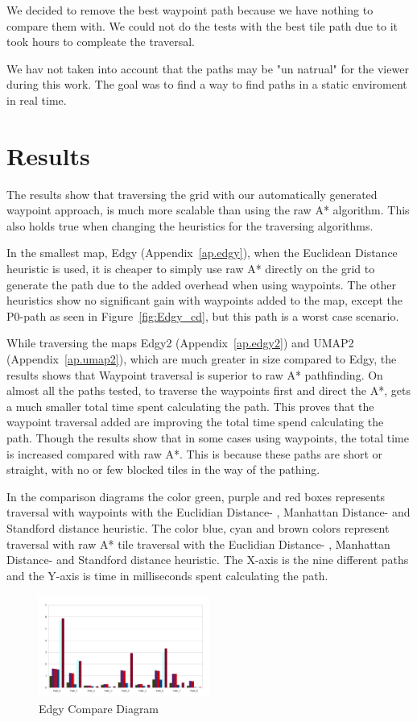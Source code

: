 \documentclass[a4paper]{article}
\begin{document}
We decided to remove the best waypoint path because we have nothing to compare them with. We could not do the tests with the best tile path due to it took hours to compleate the traversal.
	
We hav not taken into account that the paths may be "un natrual" for the viewer during this work. The goal was to find a way to find paths in a static enviroment in real time.

\section{Results}
The results show that traversing the grid with our automatically generated waypoint approach, is much more scalable than using the raw A* algorithm. This also holds true when changing the heuristics for the traversing algorithms.
	
In the smallest map, Edgy (Appendix~\ref{ap.edgy}), when the Euclidean Distance heuristic is used, it is cheaper to simply use raw A* directly on the grid to generate the path due to the added overhead when using waypoints. The other heuristics show no significant gain with waypoints added to the map, except the P0-path as seen in Figure~\ref{fig:Edgy_cd}, but this path is a worst case scenario.
	
While traversing the maps Edgy2 (Appendix~\ref{ap.edgy2}) and UMAP2 (Appendix~\ref{ap.umap2}), which are much greater in size compared to Edgy, the results shows that Waypoint traversal is superior to raw A* pathfinding. On almost all the paths tested, to traverse the waypoints first and direct the A*, gets a much smaller total time spent calculating the path. This proves that the waypoint traversal added are improving the total time spend calculating the path. Though the results show that in some cases using waypoints, the total time is increased compared with raw A*. This is because these paths are short or straight, with no or few blocked tiles in the way of the pathing.
	
In the comparison diagrams the color green, purple and red boxes represents traversal with waypoints with the Euclidian Distance- , Manhattan Distance- and Standford distance heuristic.
The color blue, cyan and brown colors represent traversal with raw A* tile traversal with the Euclidian Distance- , Manhattan Distance- and Standford distance heuristic.
The  X-axis is the nine different paths and the Y-axis is time in milliseconds spent calculating the path.

\begin{figure}[h!]
\centering
\includegraphics[width=0.5\textwidth,height=\textheight,keepaspectratio]{ChartsAndFigures/Edgy_d2.png}
\caption{Edgy Compare Diagram}
\label{fig:Edgy_d2}
\end{figure}
\end{document}
